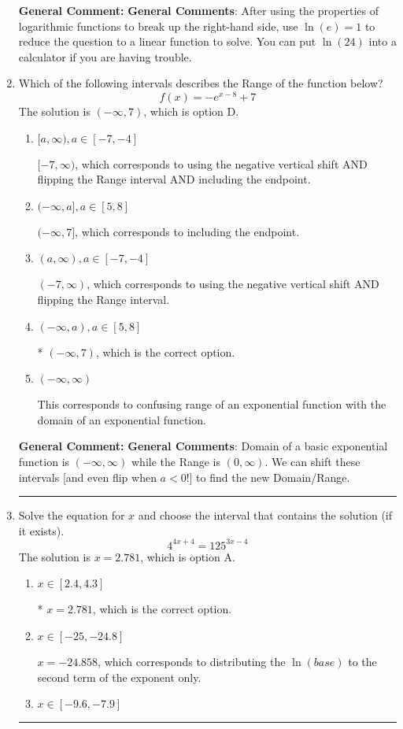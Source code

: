 \documentclass{extbook}[14pt]
\newcommand{\litem}[1]{\item #1

\rule{\textwidth}{0.4pt}}
\begin{document}
\begin{enumerate}
{\textbf{General Comment:} \textbf{General Comments}: After using the properties of logarithmic functions to break up the right-hand side, use $\ln(e) = 1$ to reduce the question to a linear function to solve. You can put $\ln(24)$ into a calculator if you are having trouble.
}
\litem{
Which of the following intervals describes the Range of the function below?
\[ f(x) = -e^{x-8}+7 \]The solution is \( (-\infty, 7) \), which is option D.\begin{enumerate}[label=\Alph*.]
\item \( [a, \infty), a \in [-7, -4] \)

$[-7, \infty)$, which corresponds to using the negative vertical shift AND flipping the Range interval AND including the endpoint.
\item \( (-\infty, a], a \in [5, 8] \)

$(-\infty, 7]$, which corresponds to including the endpoint.
\item \( (a, \infty), a \in [-7, -4] \)

$(-7, \infty)$, which corresponds to using the negative vertical shift AND flipping the Range interval.
\item \( (-\infty, a), a \in [5, 8] \)

* $(-\infty, 7)$, which is the correct option.
\item \( (-\infty, \infty) \)

This corresponds to confusing range of an exponential function with the domain of an exponential function.
\end{enumerate}

\textbf{General Comment:} \textbf{General Comments}: Domain of a basic exponential function is $(-\infty, \infty)$ while the Range is $(0, \infty)$. We can shift these intervals [and even flip when $a<0$!] to find the new Domain/Range.
}
\litem{
Solve the equation for $x$ and choose the interval that contains the solution (if it exists).
\[ 4^{4x+4} = 125^{3x-4} \]The solution is \( x = 2.781 \), which is option A.\begin{enumerate}[label=\Alph*.]
\item \( x \in [2.4, 4.3] \)

* $x = 2.781$, which is the correct option.
\item \( x \in [-25, -24.8] \)

$x = -24.858$, which corresponds to distributing the $\ln(base)$ to the second term of the exponent only.
\item \( x \in [-9.6, -7.9] \)


\end{enumerate}}
\end{enumerate}
\end{document}
